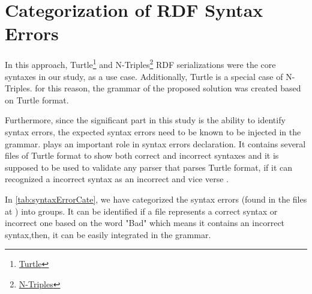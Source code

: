 \section{Categorization of RDF Syntax Errors}
 In this approach, Turtle\footnote{\href{https://www.w3.org/TR/turtle/}{Turtle}} and N-Triples\footnote{\href{https://www.w3.org/TR/n-triples/}{N-Triples}} RDF serializations were the core syntaxes in our study, as a use case. Additionally, Turtle is a special case of N-Triples. for this reason, the grammar of the proposed solution was created based on Turtle format. 
 
 Furthermore, since the significant part in this study is the ability to identify syntax errors, the expected syntax errors need to be known to be injected in the grammar. \cite{TurtleTests:Online} plays an important role in syntax errors declaration. It contains several files of Turtle format to show both correct and incorrect syntaxes and it is supposed to be used to validate any parser that parses Turtle format, if it can recognized a incorrect syntax as an incorrect and vice verse . 
 
 In \ref{tab:syntaxErrorCate}, we have categorized the syntax errors (found in the files at \cite{TurtleTests:Online}) into groups. It can be identified if a file represents a correct syntax or incorrect one based on the word "Bad" which means it contains an incorrect syntax,then, it can be easily integrated in the grammar.  
 

